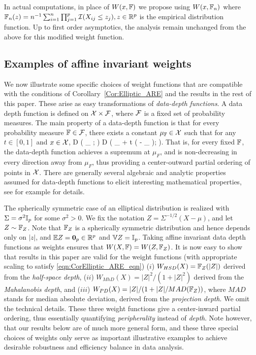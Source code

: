 In actual computations, in place of $W (x, {\mathbb{F}})$ we propose using $W (x, {\mathbb{F}}_{n})$ where
$ {\mathbb{F}}_{n}(z) = n^{-1} \sum_{i = 1}^{n} \prod_{j=1}^{p}
\mathcal{I} (X_{ij} \leq z_j ), z \in {\mathbb{R}}^p
$ is the empirical distribution function. Up to first order asymptotics, the analysis remain unchanged from the above for this modified weight function.

\subsection{Examples of affine invariant weights}

We now illustrate some specific choices of weight functions that are compatible with the 
conditions of Corollary~\ref{Cor:Elliptic_ARE} and the results in the rest of this paper.
 These arise as easy transformations 
of \textit{data-depth functions}. A data depth function 
is defined on $\mathcal{X} \times \mathcal{F}$, where $\mathcal{F}$ is  a fixed set of probability measures.
The main property of a data-depth function is that for every probability measure 
${\mathbb{F}} \in \mathcal{F}$, there exists a constant 
$\mu_{{\mathbb{F}}} \in  \mathcal{X}$ such that for any $t \in [ 0, 1]$ and $x \in \mathcal{X}$,
\baq 
D ( \mu_{\BF} ; \BF ) \geq D ( \mu_{\BF} + t ( \bfx - \mu_{\BF} ); \BF ). 
\label{eq:Peripherality}
\eaq
That is, for every fixed ${\mathbb{F}}$, the data-depth function achieves a supremum at 
$\mu_{F}$, and is non-decreasing in every direction away from $\mu_{F}$, thus providing 
a  center-outward partial ordering of points in $\mathcal{X}$. There are generally several 
algebraic and analytic properties assumed for data-depth functions to elicit interesting 
mathematical properties, see for example \cite{ref:DIMACS061_Serfling, ref:AoS00461_ZuoSerfling} for details. 


The spherically symmetric case of an elliptical distribution is realized with $\Sigma = \sigma^{2} {\mathbb{I}}_{p}$ for some $\sigma^{2} > 0$. We fix the notation $Z = \Sigma^{-1/2} (X - \mu)$, and let 
$Z \sim {\mathbb{F}}_{Z}$. Note that ${\mathbb{F}}_{Z}$ is a spherically symmetric distribution and hence
depends only on $|z|$, and ${\mathbb{E}} Z = \mathbf{0}_{p} \in {\mathbb{R}}^{p}$ and ${\mathbb{V}} Z = {\mathbb{I}}_{p}$. Taking affine invariant data depth functions as weights ensures that $W(X, {\mathbb{F}}) = W(Z, {\mathbb{F}}_Z)$. It is now easy to show that results in this paper are valid for the weight functions (with appropriate scaling to satisfy \eqref{eqn:CorElliptic_ARE_eqn})
($i$) $W_{HSD} (X) = {\mathbb{F}}_{Z} (| Z |)$ derived from the \textit{half-space depth},  
($ii$) $W_{MhD} (X) = |Z|^{2}/(1 + | Z |^2)$ derived from the \textit{Mahalanobis depth}, 
and ($iii$) $W_{PD} (X) = |Z|/(1+ | Z |/MAD({\mathbb{F}}_{Z}))$, where $MAD$ stands for median 
absolute deviation, derived from the \textit{projection depth}. We omit the technical 
details. These three weight functions give a center-inward partial ordering, thus essentially 
quantifying \textit{peripherality} instead of \textit{depth}.
Note however, that our results below are of much more general form, and 
these three special choices of weights only serve as important illustrative examples 
to achieve desirable robustness and efficiency balance in data analysis.


